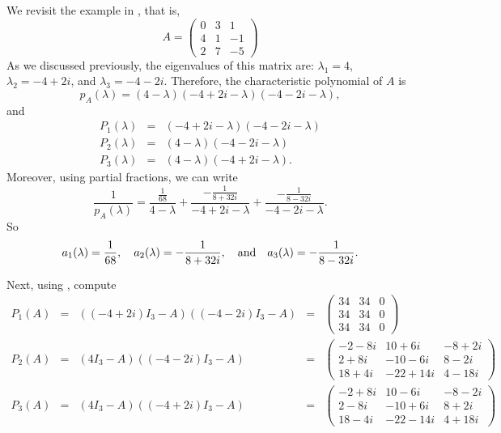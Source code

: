 \documentclass{ximera}
\begin{document}
We revisit the example in , that is, 
\[
A = \left(\begin{array}{rrr}
     0  &  3  &  1\\
     4  &  1  & -1\\
     2  &  7  & -5
\end{array}\right)
\]
As we discussed previously, the eigenvalues of this matrix are:
$\lambda_1=4$, $\lambda_2=-4+2i$, and $\lambda_3=-4-2i$.
Therefore, the characteristic 
polynomial of $A$ is
\[
p_A(\lambda) = (4-\lambda)(-4+2i-\lambda)(-4-2i-\lambda),
\]
and
\begin{eqnarray*}
P_1(\lambda) & = & (-4+2i-\lambda)(-4-2i-\lambda) \\
P_2(\lambda)& = & (4-\lambda)(-4-2i-\lambda)\\  
P_3(\lambda) & = & (4-\lambda)(-4+2i-\lambda).
\end{eqnarray*}
Moreover, using partial fractions, 
we can write
\[
\frac{1}{p_A(\lambda)} = \frac{\frac{1}{68}}{4-\lambda} + 
\frac{-\frac{1}{8+32i}}{-4+2i-\lambda}
+ \frac{-\frac{1}{8-32i}}{-4-2i-\lambda}.
\]
So
\[
a_1(\lambda)=\frac{1}{68}, \quad a_2(\lambda)=-\frac{1}{8+32i},
 \quad\mbox{and}\quad a_3(\lambda)=-\frac{1}{8-32i}.
\]

Next, using \Matlabp, compute
\[
\begin{array}{rcccl}
P_1(A) & = & ((-4+2i)I_3-A)((-4-2i)I_3-A) & = & 
\left(\begin{array}{rrr}  
     34    &       34    &        0 \\     
     34    &       34    &        0 \\     
     34    &       34    &        0      
\end{array}\right) \\
P_2(A) & = & (4I_3-A)((-4-2i)I_3-A) & = &  
\left(\begin{array}{rrr}
     -2  - 8i     &   10  +  6i  &  -8  +  2i \\     
      2  + 8i     &  -10  -  6i  &   8  -  2i \\     
     18  + 4i     &  -22  + 14i  &   4  - 18i       
\end{array}\right) \\
P_3(A) & = & (4I_3-A)((-4+2i)I_3-A) & = & 
\left(\begin{array}{rrr}
     -2  + 8i     &   10  -  6i  &  -8  -  2i \\      
      2  - 8i     &  -10  +  6i  &   8  +  2i \\   
     18  - 4i     &  -22  - 14i  &   4  + 18i    
\end{array}\right)
\end{array}
\]
\end{document}
